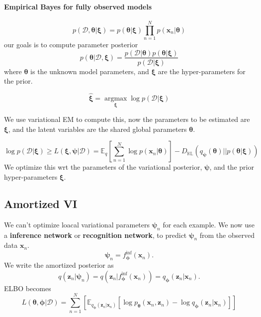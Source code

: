 \documentclass[../main.tex]{subfiles}
\begin{document}
\paragraph{Empirical Bayes for fully observed models}

\[
p(\mathcal{D}, \boldsymbol{\theta} | \boldsymbol{\xi }) = p(\boldsymbol{\theta} | \boldsymbol{\xi }) \prod _{n=1}^{N} p(\boldsymbol{x}_{n} | \boldsymbol{\theta})
\]
our goals is to compute parameter posterior
\[
p(\boldsymbol{\theta} | \mathcal{D}, \boldsymbol{\xi }) = \frac{p(\mathcal{D} | \boldsymbol{\theta})p(\boldsymbol{\theta} | \boldsymbol{\xi })}{p(\mathcal{D}| \boldsymbol{\xi })}
\]
where $\boldsymbol{\theta}$ is the unknown model parameters, and $\boldsymbol{\xi }$ are the hyper-parameters for the prior.

\[
\hat{\boldsymbol{\xi }} = \mathop{\arg\max}\limits_{\boldsymbol{\xi }} \log p(\mathcal{D} | \boldsymbol{\xi })
\]

We use variational EM to compute this, now the parameters to be estimated are $\boldsymbol{\xi }$, and the latent variables are the shared global parameters $\boldsymbol{\theta}$.

\[
\log p(\mathcal{D} | \boldsymbol{\xi }) \ge  L(\boldsymbol{\xi }, \boldsymbol{\psi} | \mathcal{D}) = \mathbb{E}_{q} \left[ \sum_{n=1}^{N} \log p(\boldsymbol{x}_{n} | \boldsymbol{\theta}) \right] - D_{\mathbb{KL}}\left( q_{\boldsymbol{\psi}}(\boldsymbol{\theta}) ||p(\boldsymbol{\theta} | \boldsymbol{\xi }) \right) 
\]
We optimize this wrt the parameters of the variational posterior, $\boldsymbol{\psi}$, and the prior hyper-parameters $\boldsymbol{\xi }$.


\subsection{Amortized VI}\label{sec:amortized-vi}


We can't optimize loacal variational parameters $\boldsymbol{\psi}_{n}$ for each example. We now use a \textbf{inference network} or \textbf{recognition network}, to predict $\boldsymbol{\psi}_{n}$ from the observed data $\boldsymbol{x}_{n}$.
\[
\boldsymbol{\psi}_{n} = f_{\boldsymbol{\phi}}^{\text{inf}}(\boldsymbol{x}_{n}).
\]
We write the amortized posterior as 
\[
q(\boldsymbol{z}_{n} | \boldsymbol{\psi}_{n}) = q(\boldsymbol{z}_{n} | f_{\boldsymbol{\phi}}^{\text{inf}}(\boldsymbol{x}_{n})) = q_{\boldsymbol{\phi}} (\boldsymbol{z}_{n} | \boldsymbol{x}_{n}).
\]
ELBO becomes
\[
L(\boldsymbol{\theta}, \boldsymbol{\phi} | \mathcal{D}) = \sum_{n=1}^{N} \left[ \mathbb{E}_{q_{\boldsymbol{\phi}}(\boldsymbol{z}_{n} | \boldsymbol{x}_{n})} \left[ \log p_{\boldsymbol{\theta}} (\boldsymbol{x}_{n}, \boldsymbol{z}_{n}) - \log q_{\boldsymbol{\phi}}(\boldsymbol{z}_{n} | \boldsymbol{x}_{n})\right]  \right] 
\]
\end{document}
